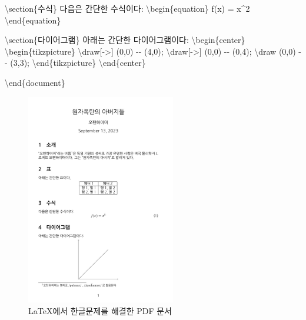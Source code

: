\documentclass[
  letterpaper,
]{book}
\newenvironment{Shaded}{\begin{snugshade}}{\end{snugshade}}
\newcommand{\ExtensionTok}[1]{\textcolor[rgb]{0.00,0.23,0.31}{#1}}
\newcommand{\FunctionTok}[1]{\textcolor[rgb]{0.28,0.35,0.67}{#1}}
\newcommand{\KeywordTok}[1]{\textcolor[rgb]{0.00,0.23,0.31}{#1}}
\newcommand{\NormalTok}[1]{\textcolor[rgb]{0.00,0.23,0.31}{#1}}
\newcommand{\SpecialStringTok}[1]{\textcolor[rgb]{0.13,0.47,0.30}{#1}}
\begin{document}
\begin{Shaded}
\begin{Highlighting}[]
\KeywordTok{\textbackslash{}section}\NormalTok{\{수식\}}
\NormalTok{다음은 간단한 수식이다:}
\KeywordTok{\textbackslash{}begin}\NormalTok{\{}\ExtensionTok{equation}\NormalTok{\}}
\SpecialStringTok{  f(x) = x\^{}2}
\KeywordTok{\textbackslash{}end}\NormalTok{\{}\ExtensionTok{equation}\NormalTok{\}}

\KeywordTok{\textbackslash{}section}\NormalTok{\{다이어그램\}}
\NormalTok{아래는 간단한 다이어그램이다:}
\KeywordTok{\textbackslash{}begin}\NormalTok{\{}\ExtensionTok{center}\NormalTok{\}}
\KeywordTok{\textbackslash{}begin}\NormalTok{\{}\ExtensionTok{tikzpicture}\NormalTok{\}}
  \FunctionTok{\textbackslash{}draw}\NormalTok{[{-}\textgreater{}] (0,0) {-}{-} (4,0);}
  \FunctionTok{\textbackslash{}draw}\NormalTok{[{-}\textgreater{}] (0,0) {-}{-} (0,4);}
  \FunctionTok{\textbackslash{}draw}\NormalTok{ (0,0) {-}{-} (3,3);}
\KeywordTok{\textbackslash{}end}\NormalTok{\{}\ExtensionTok{tikzpicture}\NormalTok{\}}
\KeywordTok{\textbackslash{}end}\NormalTok{\{}\ExtensionTok{center}\NormalTok{\}}

\KeywordTok{\textbackslash{}end}\NormalTok{\{}\ExtensionTok{document}\NormalTok{\}}
\end{Highlighting}
\end{Shaded}

\begin{figure}

{\centering \includegraphics[width=2.5625in,height=\textheight]{images/pdf_korean_hangul.jpg}

}

\caption{\LaTeX 에서 한글문제를 해결한 PDF 문서}

\end{figure}
\end{document}
